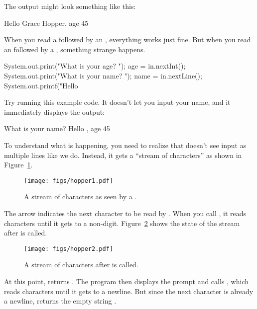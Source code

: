 The output might look something like this:

\begin{stdout}
Hello Grace Hopper, age 45
\end{stdout}

When you read a  followed by an , everything works just fine.
But when you read an  followed by a , something strange happens.

\begin{code}
System.out.print("What is your age? ");
age = in.nextInt();
System.out.print("What is your name? ");
name = in.nextLine();
System.out.printf("Hello %
\end{code}

Try running this example code.
It doesn't let you input your name, and it immediately displays the output:

\begin{stdout}
What is your name? Hello , age 45
\end{stdout}

To understand what is happening, you need to realize that  doesn't see input as multiple lines like we do.
Instead, it gets a ``stream of characters'' as shown in Figure~\ref{fig.hopper1}.

\begin{figure}[!ht]
\begin{center}
\texttt{[image: figs/hopper1.pdf]}
\caption{A stream of characters as seen by a .}
\label{fig.hopper1}
\end{center}
\end{figure}


The arrow indicates the next character to be read by .
When you call , it reads characters until it gets to a non-digit.
Figure~\ref{fig.hopper2} shows the state of the stream after  is called.

\begin{figure}[!ht]
\begin{center}
\texttt{[image: figs/hopper2.pdf]}
\caption{A stream of characters after  is called.}
\label{fig.hopper2}
\end{center}
\end{figure}

At this point,  returns .
The program then displays the prompt  and calls , which reads characters until it gets to a newline.
But since the next character is already a newline,  returns the empty string .


